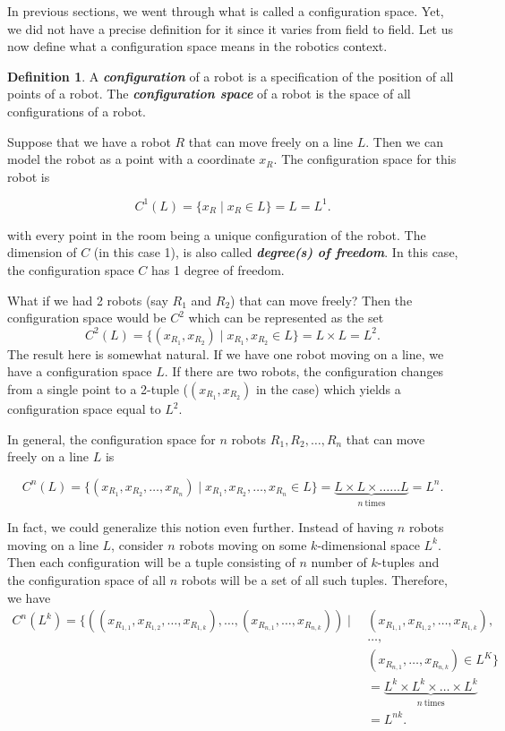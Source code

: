 \documentclass[12pt]{article}
\theoremstyle{definition}
\newtheorem*{definition}{Definition}
\begin{document}
In previous sections, we went through what is called a configuration space.
Yet, we did not have a precise definition for it since it varies from field to field.
Let us now define what a configuration space means in the robotics context.

\begin{definition}
\cite{12} A \textit{\textbf{configuration}} of a robot is a specification of the position of all points of a robot.
The \textit{\textbf{configuration space}} of a robot is the space of all configurations of a robot.
\end{definition}

Suppose that we have a robot $R$ that can move freely on a line $L$. Then we can model the robot as
a point with a coordinate $x_R$. The configuration space for this robot is

$$C^1(L) = \{x_R \mid x_R \in L\} = L = L^1.$$

with every point in the room being a unique configuration of the robot.
The dimension of $C$ (in this case 1), is also called \textit{\textbf{degree(s) of freedom}}.
In this case, the configuration space $C$ has 1 degree of freedom.

\bigskip

What if we had 2 robots (say $R_1$ and $R_2$) that can move freely?
Then the configuration space would be $C^2$ which can be represented as the set
$$C^2(L) = \{(x_{R_1}, x_{R_2}) \mid x_{R_1}, x_{R_2} \in L\} = L \times L = L^2.$$
The result here is somewhat natural. If we have one robot moving on a line, we have a configuration
space $L$. If there are two robots, the configuration changes from a single point to a 2-tuple
($(x_{R_1}, x_{R_2})$ in the case) which yields a configuration space equal to $L^2$.

\bigskip

In general, the configuration space for $n$ robots $R_1, R_2, \dots, R_n$ that can move freely on a line $L$ is

$$C^n(L) = \{(x_{R_1}, x_{R_2}, \dots, x_{R_n}) \mid x_{R_1}, x_{R_2}, \dots, x_{R_n} \in L\} = \underbrace{L \times L \times \dots \dots L}_{n \ \text{times}} = L^n.$$

In fact, we could generalize this notion even further. Instead of having
$n$ robots moving on a line $L$, consider $n$ robots moving on some $k$-dimensional space $L^k$.
Then each configuration will be a tuple consisting of $n$ number of $k$-tuples and the configuration
space of all $n$ robots will be a set of all such tuples. Therefore, we have
\begin{equation*}
    \begin{split}
    C^n(L^k) = \{((x_{R_{1, 1}}, x_{R_{1, 2}}, \dots, x_{R_{1, k}}), \dots, (x_{R_{n, 1}}, \dots, x_{R_{n, k}})) \mid \ & (x_{R_{1, 1}}, x_{R_{1, 2}}, \dots, x_{R_{1, k}}),\\
    &\dots,\\
    &(x_{R_{n, 1}}, \dots, x_{R_{n, k}}) \in L^K\}\\
    &= \underbrace{L^k \times L^k \times \dots \times L^k}_{n \ \text{times}}\\
    &= L^{nk}.
    \end{split}
\end{equation*}
\end{document}

